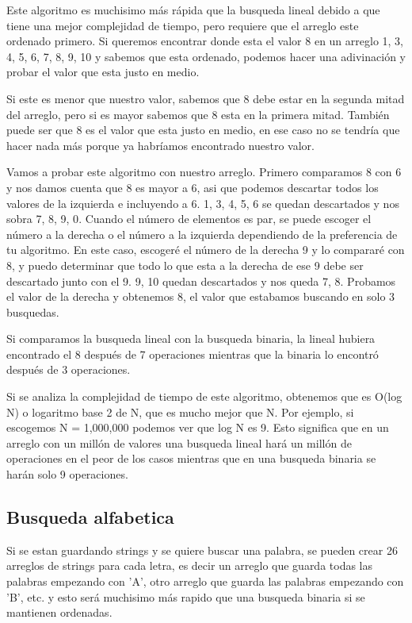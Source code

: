 \documentclass{article}
\begin{document}
Este algoritmo es muchisimo más rápida que la busqueda lineal debido a que tiene una mejor complejidad de tiempo, pero requiere que el arreglo este ordenado primero. Si queremos encontrar donde esta el valor 8 en un arreglo {1, 3, 4, 5, 6, 7, 8, 9, 10} y sabemos que esta ordenado, podemos hacer una adivinación y probar el valor que esta justo en medio.

Si este es menor que nuestro valor, sabemos que 8 debe estar en la segunda mitad del arreglo, pero si es mayor sabemos que 8 esta en la primera mitad. También puede ser que 8 es el valor que esta justo en medio, en ese caso no se tendría que hacer nada más porque ya habríamos encontrado nuestro valor.

Vamos a probar este algoritmo con nuestro arreglo. Primero comparamos 8 con 6 y nos damos cuenta que 8 es mayor a 6, asi que podemos descartar todos los valores de la izquierda e incluyendo a 6. {1, 3, 4, 5, 6} se quedan descartados y nos sobra {7, 8, 9,  0}. Cuando el número de elementos es par, se puede escoger el número a la derecha o el número a la izquierda dependiendo de la preferencia de tu algoritmo. En este caso, escogeré el número de la derecha 9 y lo compararé con 8, y puedo determinar que todo lo que esta a la derecha de ese 9 debe ser descartado junto con el 9. {9, 10} quedan descartados y nos queda {7, 8}. Probamos el valor de la derecha y obtenemos 8, el valor que estabamos buscando en solo 3 busquedas.

Si comparamos la busqueda lineal con la busqueda binaria, la lineal hubiera encontrado el 8 después de 7 operaciones mientras que la binaria lo encontró después de 3 operaciones.

Si se analiza la complejidad de tiempo de este algoritmo, obtenemos que es O(log N) o logaritmo base 2 de N, que es mucho mejor que N. Por ejemplo, si escogemos N = 1,000,000 podemos ver que log N es 9. Esto significa que en un arreglo con un millón de valores una busqueda lineal hará un millón de operaciones en el peor de los casos mientras que en una busqueda binaria se harán solo 9 operaciones. 

\subsection{Busqueda alfabetica}

Si se estan guardando strings y se quiere buscar una palabra, se pueden crear 26 arreglos de strings para cada letra, es decir un arreglo que guarda todas las palabras empezando con 'A', otro arreglo que guarda las palabras empezando con 'B', etc. y esto será muchisimo más rapido que una busqueda binaria si se mantienen ordenadas.
\end{document}

